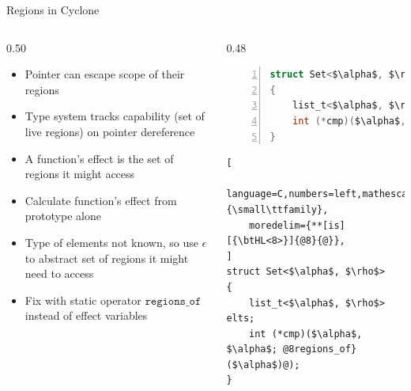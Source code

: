 \documentclass[aspectratio=169]{beamer}
\begin{document}
\begin{frame}[fragile]{Regions in Cyclone}
\footnotesize

  \begin{columns}[T]
    \begin{column}{0.50\textwidth}
      \begin{itemize}[<+->]
        \item Pointer can escape scope of their regions 
        \item Type system tracks \alert{capability} (set of live regions) on pointer dereference %
        \item A function's \alert{effect} is the set of regions it might access
        \item Calculate function's effect from prototype alone
        \item Type of elements not known, so use $\epsilon$ to abstract set of regions it might need to access
        \item Fix with static operator $\texttt{regions\_of}$ instead of effect variables %
      \end{itemize}
    \end{column}

    \pause

\begin{column}{0.48\textwidth}

\begin{lstlisting}[language=C,numbers=left,mathescape,basicstyle={\footnotesize\ttfamily}]
struct Set<$\alpha$, $\rho$, $\epsilon$>
{
    list_t<$\alpha$, $\rho$> elts;
    int (*cmp)($\alpha$, $\alpha$; $\epsilon$);
}
\end{lstlisting}

\pause

\begin{lstlisting}[
    language=C,numbers=left,mathescape,basicstyle={\small\ttfamily},
    moredelim={**[is][{\btHL<8>}]{@8}{@}},
]
struct Set<$\alpha$, $\rho$>
{
    list_t<$\alpha$, $\rho$> elts;
    int (*cmp)($\alpha$, $\alpha$; @8regions_of}($\alpha$)@);
}
\end{lstlisting}

\end{column}
\end{columns}

\end{frame}
\end{document}
